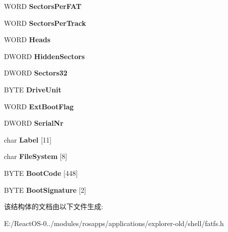 \begin{DoxyCompactItemize}
W\+O\+RD {\bfseries Sectors\+Per\+F\+AT}
\item 
\mbox{\label{struct_boot_sector_a8cdce88d98b9f4528e7679900a1c1367}} 
W\+O\+RD {\bfseries Sectors\+Per\+Track}
\item 
\mbox{\label{struct_boot_sector_a068c50e319edf684058e688d58ae1869}} 
W\+O\+RD {\bfseries Heads}
\item 
\mbox{\label{struct_boot_sector_a7d58d917cadc340aa37e5f6f3d86f001}} 
D\+W\+O\+RD {\bfseries Hidden\+Sectors}
\item 
\mbox{\label{struct_boot_sector_aa76b0c23422ac24f2eb0d1e20516dba9}} 
D\+W\+O\+RD {\bfseries Sectors32}
\item 
\mbox{\label{struct_boot_sector_ab7c44e813ec4183d938ae5736600a10b}} 
B\+Y\+TE {\bfseries Drive\+Unit}
\item 
\mbox{\label{struct_boot_sector_a918d349a8a43e57d2b5e8def67cba2b0}} 
W\+O\+RD {\bfseries Ext\+Boot\+Flag}
\item 
\mbox{\label{struct_boot_sector_a17fd3548297de65d701f139bcb43642a}} 
D\+W\+O\+RD {\bfseries Serial\+Nr}
\item 
\mbox{\label{struct_boot_sector_a759a9adb166aa639f17a3b7e17ffc1c7}} 
char {\bfseries Label} \mbox{[}11\mbox{]}
\item 
\mbox{\label{struct_boot_sector_a4ae88a751a5f2bf86184b94fde9c2f2a}} 
char {\bfseries File\+System} \mbox{[}8\mbox{]}
\item 
\mbox{\label{struct_boot_sector_a7f315a3c1171acddf82a98799af4f1cd}} 
B\+Y\+TE {\bfseries Boot\+Code} \mbox{[}448\mbox{]}
\item 
\mbox{\label{struct_boot_sector_acb1f4fef275126e82ce2d8f687505118}} 
B\+Y\+TE {\bfseries Boot\+Signature} \mbox{[}2\mbox{]}
\end{DoxyCompactItemize}


该结构体的文档由以下文件生成\+:\begin{DoxyCompactItemize}
\item 
E\+:/\+React\+O\+S-\/0../modules/rosapps/applications/explorer-\/old/shell/fatfs.\+h\end{DoxyCompactItemize}
